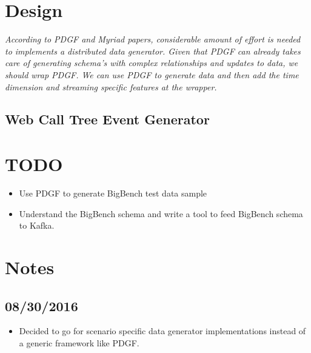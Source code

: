 \documentclass{thesis}
\begin{document}
\section{Design}

\emph{According to PDGF and Myriad papers, considerable amount of effort is needed to implements a distributed data generator. Given that PDGF can already takes care of generating schema's with complex relationships and updates to data, we should wrap PDGF. We can use PDGF to generate data and then add the time dimension and streaming specific features at the wrapper.}

\subsection{Web Call Tree Event Generator}


\section{TODO}

\begin{itemize}
	\item Use PDGF to generate BigBench test data sample
	\item Understand the BigBench schema and write a tool to feed BigBench schema to Kafka.
\end{itemize}

\section{Notes}

\subsection{08/30/2016}

\begin{itemize}
    \item Decided to go for scenario specific data generator implementations instead of a generic framework like PDGF.
\end{itemize}




\end{document}
